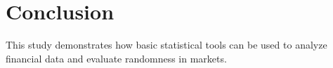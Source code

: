 \section{Conclusion}

This study demonstrates how basic statistical tools can be used to analyze financial data and evaluate randomness in markets.